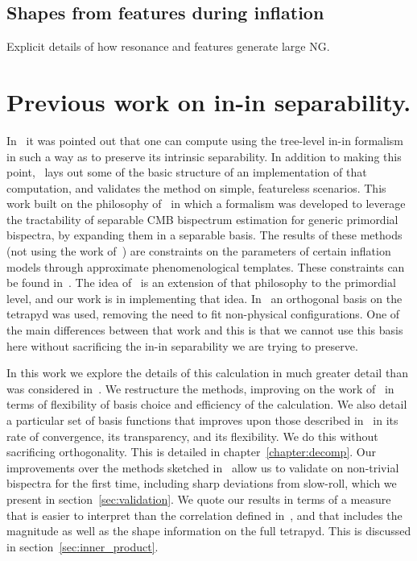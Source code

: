     \subsection{Shapes from features during inflation}
    Explicit details of how resonance and features generate large NG.
\section{Previous work on in-in separability.}
    In~\cite{Funakoshi} it was pointed out that one can compute using the
tree-level in-in formalism in such a way as to preserve its intrinsic
separability. In addition to making this point,~\cite{Funakoshi} lays
out some of the basic structure of an implementation of that computation,
and validates the method on simple, featureless scenarios.
This work built on the philosophy of~\cite{FergShell_1,FergShell_2,FergShell_3}
in which a formalism was developed to
leverage the tractability of separable CMB bispectrum estimation
for generic primordial bispectra, by expanding them in a separable basis.
The results of these methods (not using the work of~\cite{Funakoshi})
are constraints on the parameters of certain inflation models through approximate
phenomenological templates.
These constraints can be found in~\cite{Planck_NG_2015, Planck_NG_2018}.
The idea of~\cite{Funakoshi} is an extension of that philosophy to the primordial level,
and our work is in implementing that idea.
In~\cite{FergShell_1,FergShell_2,FergShell_3} an orthogonal basis on the tetrapyd was used,
removing the need to fit non-physical configurations.
One of the main differences between that work and this
is that we cannot use this basis here without sacrificing the
in-in separability we are trying to preserve.

In this work we explore the details of this calculation in much greater detail
than was considered in~\cite{Funakoshi}.
We restructure the methods, improving on the work of~\cite{Funakoshi} in terms
of flexibility of basis choice and efficiency of the calculation.
We also detail a particular set of basis functions that improves upon those described
in~\cite{Funakoshi} in its rate of convergence, its transparency,
and its flexibility.
We do this without sacrificing orthogonality.
This is detailed in chapter~\ref{chapter:decomp}.
Our improvements over the methods sketched in~\cite{Funakoshi} allow us to validate
on non-trivial bispectra for the first time, including sharp deviations from slow-roll, which we present in
section~\ref{sec:validation}.
We quote our results in terms of a measure that is
easier to interpret than the correlation defined in~\cite{Funakoshi},
and that includes the magnitude as well as the shape information
on the full tetrapyd.
This is discussed in section~\ref{sec:inner_product}.
